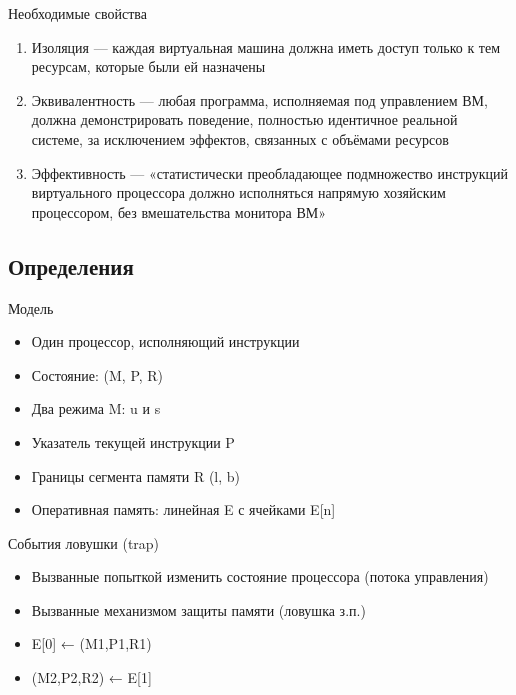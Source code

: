 \begin{frame}{Необходимые свойства}

\begin{enumerate}
\item Изоляция — каждая виртуальная машина должна иметь доступ только к тем ресурсам, которые были ей назначены
\item Эквивалентность — любая программа, исполняемая под управлением ВМ, должна демонстрировать поведение, полностью идентичное реальной системе, за исключением эффектов, связанных с объёмами ресурсов
\item Эффективность — «статистически преобладающее подмножество инструкций виртуального процессора должно исполняться напрямую хозяйским процессором, без вмешательства монитора ВМ»
\end{enumerate}

\end{frame}

\subsection{Определения}

\begin{frame}{Модель}

\begin{itemize}
\item Один процессор, исполняющий инструкции
\item Состояние: (M, P, R)
\item Два режима M: u и s
\item Указатель текущей инструкции P
\item Границы сегмента памяти R (l, b)
\item Оперативная память: линейная E с ячейками E[n]
\end{itemize}

\end{frame}

\begin{frame}{События ловушки (trap)}
\begin{itemize}
\item Вызванные попыткой изменить состояние
процессора (потока управления)
\item Вызванные механизмом защиты памяти (ловушка з.п.)

\item E[0] ← (M1,P1,R1)
\item (M2,P2,R2) ← E[1]
\end{itemize}

\end{frame}

